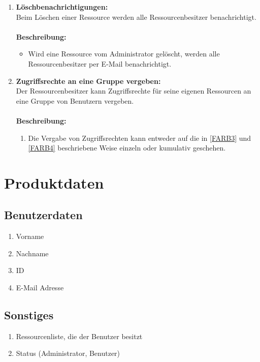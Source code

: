 \documentclass[parskip=full,11pt]{scrartcl}
\def\threedigits#1{%
  \ifnum#1<10 0\fi
  \ifnum#1<1 0\fi
  \number#1}
\begin{document}
\begin{enumerate}[label={\textbf{/F\protect\threedigits{\theenumi}0/}}, leftmargin=*, resume]
\item \label{FARB7} \colorbox{shadecolor} {\textbf{Löschbenachrichtigungen:}}\\
Beim Löschen einer Ressource werden alle Ressourcenbesitzer benachrichtigt.\\\\
\textbf{Beschreibung:}\\
\begin{itemize}[itemsep=0pt, leftmargin=*]
\item Wird eine Ressource vom Administrator gelöscht, werden alle Ressourcenbesitzer per E-Mail benachrichtigt.
\end{itemize}

\newpage
\item \label{FARB8} \colorbox{shadecolor} {\textbf{Zugriffsrechte an eine Gruppe vergeben:}}\\
Der Ressourcenbesitzer kann Zugriffsrechte für seine eigenen Ressourcen an eine Gruppe von Benutzern vergeben.\\\\
\textbf{Beschreibung:}\\
\begin{enumerate}[label=(\arabic*), leftmargin=*]
\item Die Vergabe von Zugriffsrechten kann entweder auf die in \ref{FARB3} und \ref{FARB4} beschriebene Weise einzeln oder kumulativ geschehen.
\end{enumerate}

\end{enumerate}


\section{Produktdaten}
\subsection{Benutzerdaten}
\begin{enumerate}[label={\textbf{/D\protect\threedigits{\theenumi}0/}}, leftmargin=*]
     		\item Vorname
     		\item Nachname
     		\item ID
     		\item E-Mail Adresse 
\end{enumerate}
     		 
\subsection{Sonstiges}
\begin{enumerate}[label={\textbf{/D\protect\threedigits{\theenumi}0/}}, leftmargin=*, resume]
		\item Ressourcenliste, die der Benutzer besitzt
        	\item Status (Administrator, Benutzer)     
\end{enumerate}
\end{document}
